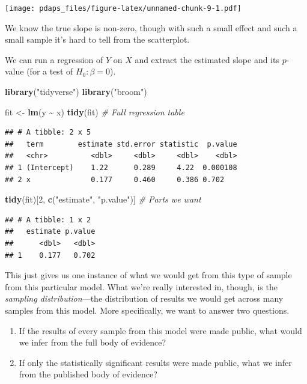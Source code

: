 \documentclass[
  12pt,
  oneside,openany]{book}
\newenvironment{Shaded}{\begin{snugshade}}{\end{snugshade}}
\newcommand{\CommentTok}[1]{\textcolor[rgb]{0.56,0.35,0.01}{\textit{#1}}}
\newcommand{\DecValTok}[1]{\textcolor[rgb]{0.00,0.00,0.81}{#1}}
\newcommand{\KeywordTok}[1]{\textcolor[rgb]{0.13,0.29,0.53}{\textbf{#1}}}
\newcommand{\NormalTok}[1]{#1}
\newcommand{\OperatorTok}[1]{\textcolor[rgb]{0.81,0.36,0.00}{\textbf{#1}}}
\newcommand{\StringTok}[1]{\textcolor[rgb]{0.31,0.60,0.02}{#1}}
\begin{document}
\texttt{[image: pdaps\_files/figure-latex/unnamed-chunk-9-1.pdf]}

We know the true slope is non-zero, though with such a small effect and such a small sample it's hard to tell from the scatterplot.

We can run a regression of \(Y\) on \(X\) and extract the estimated slope and its \(p\)-value (for a test of \(H_0 : \beta = 0\)).

\begin{Shaded}
\begin{Highlighting}[]
\KeywordTok{library}\NormalTok{(}\StringTok{"tidyverse"}\NormalTok{)}
\KeywordTok{library}\NormalTok{(}\StringTok{"broom"}\NormalTok{)}

\NormalTok{fit \textless{}{-}}\StringTok{ }\KeywordTok{lm}\NormalTok{(y }\OperatorTok{\textasciitilde{}}\StringTok{ }\NormalTok{x)}
\KeywordTok{tidy}\NormalTok{(fit)  }\CommentTok{\# Full regression table}
\end{Highlighting}
\end{Shaded}

\begin{verbatim}
## # A tibble: 2 x 5
##   term        estimate std.error statistic  p.value
##   <chr>          <dbl>     <dbl>     <dbl>    <dbl>
## 1 (Intercept)    1.22      0.289     4.22  0.000108
## 2 x              0.177     0.460     0.386 0.702
\end{verbatim}

\begin{Shaded}
\begin{Highlighting}[]
\KeywordTok{tidy}\NormalTok{(fit)[}\DecValTok{2}\NormalTok{, }\KeywordTok{c}\NormalTok{(}\StringTok{"estimate"}\NormalTok{, }\StringTok{"p.value"}\NormalTok{)]  }\CommentTok{\# Parts we want}
\end{Highlighting}
\end{Shaded}

\begin{verbatim}
## # A tibble: 1 x 2
##   estimate p.value
##      <dbl>   <dbl>
## 1    0.177   0.702
\end{verbatim}

This just gives us one instance of what we would get from this type of sample from this particular model. What we're really interested in, though, is the \emph{sampling distribution}---the distribution of results we would get across many samples from this model. More specifically, we want to answer two questions.

\begin{enumerate}
\def\labelenumi{\arabic{enumi}.}
\item
  If the results of every sample from this model were made public, what would we infer from the full body of evidence?
\item
  If only the statistically significant results were made public, what we infer from the published body of evidence?
\end{enumerate}
\end{document}
